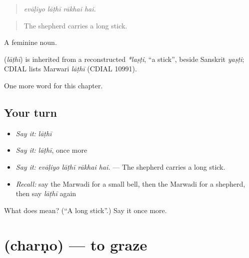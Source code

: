 \begin{quote}
   
\end{quote}

\begin{quote}
\emph{evāḷiyo lāṭhī rākhai hai.}
\end{quote}

\begin{quote}
The shepherd carries a long stick.
\end{quote}

A feminine noun.

\begin{cousinweb}
\textbf{} (\emph{lāṭhī}) is inherited from a reconstructed \emph{*laṣṭi}, \textquotedblleft{}a stick\textquotedblright{}, beside Sanskrit \emph{yaṣṭi}; CDIAL lists Marwari \emph{lāṭhī} (CDIAL 10991).
\end{cousinweb}

\begin{grammarlens}[title={What you've built}]
One more word for this chapter.
\end{grammarlens}

\subsection*{Your turn}
\begin{itemize}
\raggedright
  \item \emph{Say it:} \emph{lāṭhī}
  \item \emph{Say it:} \emph{lāṭhī}, once more
  \item \emph{Say it:} \emph{evāḷiyo lāṭhī rākhai hai.} — The shepherd carries a long stick.
  \item \emph{Recall:} say the Marwadi for a small bell, then the Marwadi for a shepherd, then say \emph{lāṭhī} again
\end{itemize}

\begin{tcolorbox}[breakable,colback=teal!4,colframe=teal!35!black,title={Before you move on}]
What does  mean? (\textquotedblleft{}A long stick\textquotedblright{}.) Say it once more.
\end{tcolorbox}
\section[\texorpdfstring{\mw{चरणो} (charṇo)}{चरणो (charṇo)}]{ (charṇo) — to graze}

\label{lesson:MW-C234-charno}



